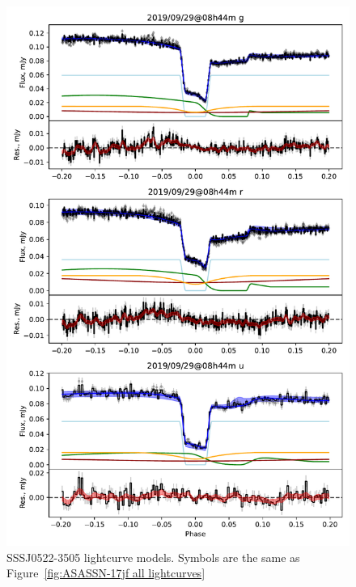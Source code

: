 \begin{figure}
    \centering
    \includegraphics[width=\textwidth]{figures/results/three_cvs_with_weird_colours/SSS111126/SSS111126_1.pdf}
    \caption{SSSJ0522-3505 lightcurve models. Symbols are the same as Figure~\ref{fig:ASASSN-17jf all lightcurves}}
    \label{fig:SSSJ0522-3505 all lightcurves}
\end{figure}

